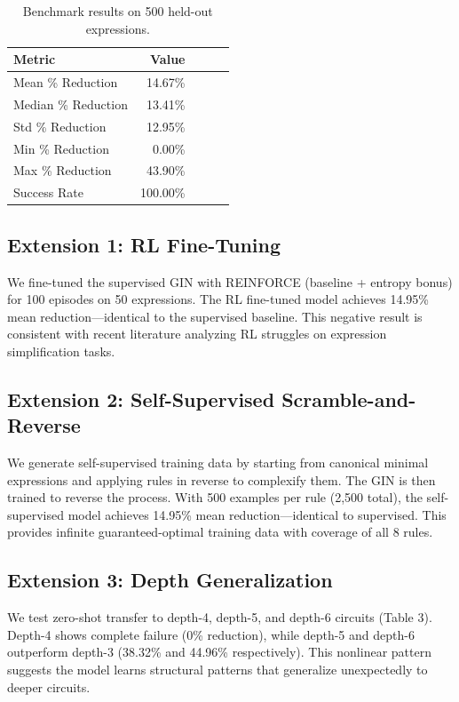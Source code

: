 \documentclass[10pt]{article}
\begin{document}
\begin{table}[h]
\centering
\caption{Benchmark results on 500 held-out expressions.}
\label{tab:benchmark}
\begin{tabular}{lrrrr}
\toprule
Metric & Value \\
\midrule
Mean \% Reduction & 14.67\% \\
Median \% Reduction & 13.41\% \\
Std \% Reduction & 12.95\% \\
Min \% Reduction & 0.00\% \\
Max \% Reduction & 43.90\% \\
Success Rate & 100.00\% \\
\bottomrule
\end{tabular}
\end{table}

\subsection{Extension 1: RL Fine-Tuning}

We fine-tuned the supervised GIN with REINFORCE (baseline + entropy bonus)
for 100 episodes on 50 expressions. The RL fine-tuned model achieves 14.95\%
mean reduction—identical to the supervised baseline. This negative result is
consistent with recent literature analyzing RL struggles on expression
simplification tasks.

\subsection{Extension 2: Self-Supervised Scramble-and-Reverse}

We generate self-supervised training data by starting from canonical minimal
expressions and applying rules in reverse to complexify them. The GIN is then
trained to reverse the process. With 500 examples per rule (2,500 total), the
self-supervised model achieves 14.95\% mean reduction—identical to supervised.
This provides infinite guaranteed-optimal training data with coverage of all 8
rules.

\subsection{Extension 3: Depth Generalization}

We test zero-shot transfer to depth-4, depth-5, and depth-6 circuits
(Table 3). Depth-4 shows complete failure (0\% reduction), while depth-5 and
depth-6 outperform depth-3 (38.32\% and 44.96\% respectively). This nonlinear
pattern suggests the model learns structural patterns that generalize
unexpectedly to deeper circuits.
\end{document}
